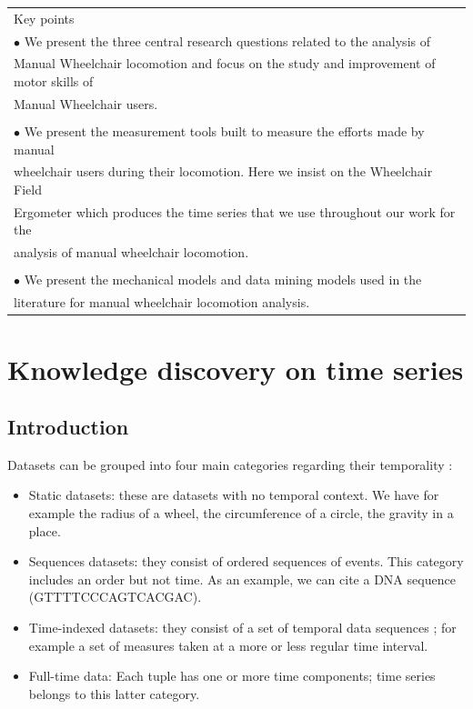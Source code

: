 \begin{table}[ht]
\centering
\begin{tabular}{|l|}

\hline
\rowcolor{LavenderBlush}
Key points\\
$\bullet$ We present the three central research questions related to the analysis of\\ Manual Wheelchair locomotion and focus on the study and improvement of motor skills of\\ Manual Wheelchair users. \\
\\
$\bullet$ We present the measurement tools built to measure the efforts made by manual\\ wheelchair users during their locomotion. Here we insist on the Wheelchair Field\\ Ergometer which produces the time series that we use throughout our work for the\\ analysis of manual wheelchair locomotion. \\
\\
$\bullet$ We present the mechanical models and data mining models used in the\\ literature for manual wheelchair locomotion analysis.\\

\hline
\end{tabular}
\end{table}





\chapter{Knowledge discovery on time series}
\label{kdd}

\section{Introduction}

Datasets can be grouped into four main categories regarding their temporality \cite{roddick2002survey} : 
\begin{itemize}
\item Static datasets: these are datasets with no temporal context. We have for example the radius of a wheel, the circumference of a circle, the gravity in a place.
\item Sequences datasets: they consist of   ordered sequences of events. This category includes an order but not time. As an example, we can cite a DNA sequence (GTTTTCCCAGTCACGAC).
\item Time-indexed datasets: they consist of a set of temporal data sequences ; for example a set of measures taken at a more or less regular time interval.
\item Full-time data: Each tuple has one or more time components; time series belongs to this latter category.
\end{itemize}

